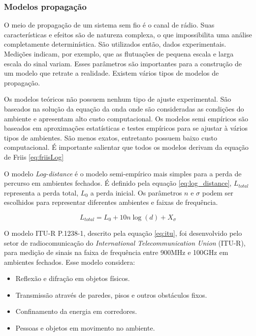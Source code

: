 \documentclass[tc,twoside]{iiufrgs}
\begin{document}
\subsubsection{Modelos propagação}

O meio de propagação de um sistema sem fio é o canal de rádio. Suas características e efeitos são de natureza complexa, o que impossibilita uma análise completamente determinística. São utilizados então, dados experimentais. Medições indicam, por exemplo, que as flutuações de pequena escala e larga escala do sinal variam. Esses parâmetros são importantes para a construção de um modelo que retrate a realidade. Existem vários tipos de modelos de propagação. \cite{najnudel2004estudo} %

 Os modelos teóricos não possuem nenhum tipo de ajuste experimental. São baseados na solução da equação da onda onde são consideradas as condições do ambiente e apresentam alto custo computacional. Os modelos semi empíricos são baseados em aproximações estatísticas e testes empíricos para se ajustar à vários tipos de ambientes. São menos exatos, entretanto possuem baixo custo computacional. É importante salientar que todos os modelos derivam da equação de Friis \ref{eq:friisLog} \cite{najnudel2004estudo} %

O modelo \textit{Log-distance} é o modelo semi-empírico mais simples para a perda de percurso em ambientes fechados. É definido pela equação \ref{eq:log_distance}, ${L}_{total}$ representa a perda total, ${L}_{0}$ a perda inicial.  Os parâmetros $n$ e $\sigma$ podem ser escolhidos para representar diferentes ambientes e faixas de frequência. \cite{najnudel2004estudo}


\begin{equation}
{L}_{total} = {L}_{0} + 10 n \log(d) + {X}_{\sigma}
\label{eq:log_distance}
\end{equation}

O modelo ITU-R P.1238-1, descrito pela equação \ref{eq:itu}, foi desenvolvido pelo setor de radiocomunicação do \textit{International Telecommunication Union} (ITU-R), para medição de sinais na faixa de frequência entre 900MHz e 100GHz em ambientes fechados. Esse modelo considera:

\begin{itemize}
\item Reflexão e difração em objetos físicos.
\item Transmissão através de paredes, pisos e outros obstáculos fixos.
\item Confinamento da energia em corredores.
\item Pessoas e objetos em movimento no ambiente.
\end{itemize}
\end{document}
